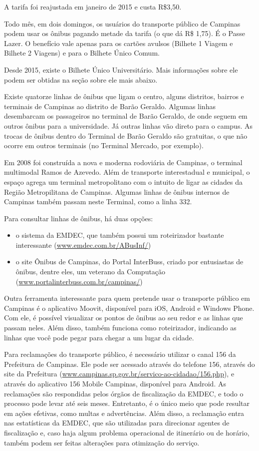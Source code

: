 A tarifa foi reajustada em janeiro de 2015 e custa R\$3,50.

Todo mês, em dois domingos, os usuários do transporte público de Campinas podem
usar os ônibus pagando metade da tarifa (o que dá R\$ 1,75). É o Passe Lazer. O
benefício vale apenas para os cartões avulsos (Bilhete 1 Viagem e Bilhete 2
Viagens) e para o Bilhete Único Comum.

Desde 2015, existe o Bilhete Único Universitário. Mais informações sobre ele
podem ser obtidas na seção sobre ele mais abaixo.

Existe quatorze linhas de ônibus que ligam o centro, alguns distritos, bairros e
terminais de Campinas ao distrito de Barão Geraldo. Algumas linhas desembarcam
os passageiros no terminal de Barão Geraldo, de onde seguem em outros ônibus
para a universidade. Já outras linhas vão direto para o campus. As trocas de
ônibus dentro do Terminal de Barão Geraldo são gratuitas, o que não ocorre em
outros terminais (no Terminal Mercado, por exemplo).

Em 2008 foi construída a nova e moderna rodoviária de Campinas, o terminal
multimodal Ramos de Azevedo. Além de transporte interestadual e municipal, o
espaço agrega um terminal metropolitano com o intuito de ligar as cidades da
Região Metropilitana de Campinas. Algumas linhas de ônibus internos de Campinas
também passam neste Terminal, como a linha 332.

Para consultar linhas de ônibus, há duas opções:
\begin{itemize}
  \item o sistema da EMDEC, que também possui um roteirizador bastante
interessante (\url{www.emdec.com.br/ABusInf/})
  \item o site Ônibus de Campinas, do Portal InterBuss, criado por entusiastas
de ônibus, dentre eles, um veterano da Computação
(\url{www.portalinterbuss.com.br/campinas/})
\end{itemize}

Outra ferramenta interessante para quem pretende usar o transporte público em
Campinas é o aplicativo Moovit, disponível para iOS, Android e Windows
Phone. Com ele, é possível visualizar os pontos de ônibus ao seu redor e as
linhas que passam neles. Além disso, também funciona como roteirizador,
indicando as linhas que você pode pegar para chegar a um lugar da cidade.

Para reclamações do transporte público, é necessário utilizar o canal 156 da
Prefeitura de Campinas. Ele pode ser acessado através do telefone 156, através
do site da Prefeitura (\url{www.campinas.sp.gov.br/servico-ao-cidadao/156.php}),
e através do aplicativo 156 Mobile Campinas, disponível para Android. As
reclamações são respondidas pelos órgãos de fiscalização da EMDEC, e todo o
processo pode levar até seis meses. Entretanto, é o único meio que pode resultar
em ações efetivas, como multas e advertências. Além disso, a reclamação entra
nas estatísticas da EMDEC, que são utilizadas para direcionar agentes de
fiscalização e, caso haja algum problema operacional de itinerário ou de
horário, também podem ser feitas alterações para otimização do serviço.

